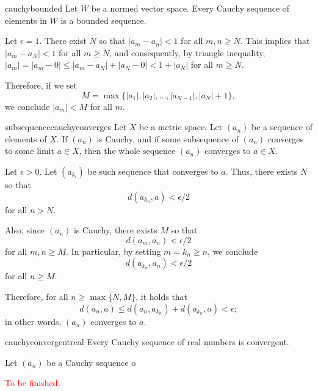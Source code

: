 
\begin{prop}{}{cauchybounded}
	Let \(W\) be a normed vector space.
	Every Cauchy sequence of elements in \(W\) is a bounded sequence.
\end{prop}

\begin{dem}{}{}
	Let \(\epsilon = 1\). There exist \(N\) so that \(|a_m - a_n| < 1\) for all \(m, n \geq N\). This implies that \(|a_m - a_N| < 1\) for all \(m \geq N\), and consequently, by triangle inequality, \(|a_m| = |a_m - 0| \leq |a_m - a_N| + |a_N - 0| < 1 + |a_N|\) for all \(m \geq N\).

	Therefore, if we set \[
		M = \max\{|a_1|, |a_2|, \dots, |a_{N-1}|, |a_N| + 1\},
	\]
	we conclude \(|a_m| < M\) for all \(m\).
\end{dem}

\begin{prop}{}{subsequencecauchyconverges}
	Let \(X\) be a metric space. Let \((a_n)\) be a sequence of elements of \(X\).
	If \((a_n)\) is Cauchy, and if some subsequence of \((a_n)\) converges to some limit \(a \in X\), then the whole sequence \((a_n)\) converges to \(a \in X\).
\end{prop}

\begin{dem}{}{}
	Let \(\epsilon > 0\). Let \((a_{k_i})\) be such sequence that converges to \(a\).
	Thus, there exists \(N\) so that \[
		d(a_{k_n}, a) < \epsilon/2
	\]
	for all \(n > N\).

	Also, since \((a_n)\) is Cauchy, there exists \(M\) so that \[
		d(a_m, a_n) < \epsilon/2
	\] for all \(m, n \geq M\).
	In particular, by setting \(m = k_n \geq n\), we conclude \[
		d(a_{k_n}, a_n) < \epsilon/2
	\] for all \(n \geq M\).

	Therefore, for all \(n \geq \max\{N, M\}\), it holds that \[
		d(a_n, a) \leq d(a_n, a_{k_n}) + d(a_{k_n}, a) < \epsilon;
	\] in other words, \((a_n)\) converges to \(a\).
\end{dem}

\begin{thm}{}{cauchyconvergentreal}
	Every Cauchy sequence of real numbers is convergent.
\end{thm}

\begin{dem}{}{}
	Let \((a_n)\) be a Cauchy sequence o

	\textcolor{red}{To be finished.}
\end{dem}

